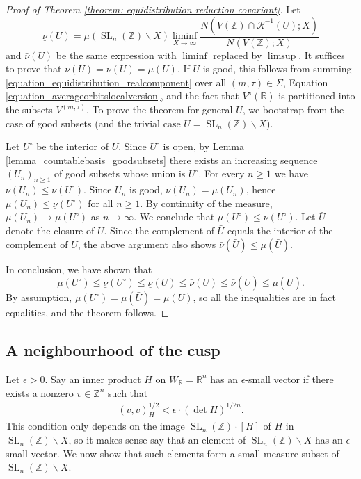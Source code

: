 \documentclass{article} %
\numberwithin{equation}{section}
\DeclareMathOperator{\SL}{SL}
\newcommand{\R}{\mathbb{R}}
\newcommand{\Z}{\mathbb{Z}}
\begin{document}
\begin{proof}[Proof of Theorem \ref{theorem: equidistribution reduction covariant}]
    Let 
    \[
    \underline{\nu}(U) = \mu(\SL_n(\Z)\backslash X) \liminf_{X\rightarrow \infty} \frac{N(V(\Z) \cap \mathcal{R}^{-1}(U);X)}{N(V(\Z);X)}
    \]
    and $\bar{\nu}(U)$ be the same expression with $\liminf$ replaced by $\limsup$.
    It suffices to prove that $\underline{\nu}(U) = \bar{\nu}(U) = \mu(U)$.
    If $U$ is good, this follows from summing \eqref{equation_equidistribution_realcomponent} over all $(m,\tau)\in \Sigma$, Equation \eqref{equation_averageorbitslocalversion}, and the fact that $V^s(\R)$ is partitioned into the subsets $V^{(m,\tau)}$.
    To prove the theorem for general $U$, we bootstrap from the case of good subsets (and the trivial case $U = \SL_n(\Z) \backslash X$).

    
    Let $U^{\circ}$ be the interior of $U$.
    Since $U^{\circ}$ is open, by Lemma \ref{lemma_countablebasis_goodsubsets} there exists an increasing sequence $(U_n)_{n\geq 1}$ of good subsets whose union is $U^{\circ}$.
    For every $n\geq 1$ we have $\underline{\nu}(U_n) \leq \underline{\nu}(U^{\circ})$.
    Since $U_n$ is good, $\underline{\nu}(U_n) = \mu(U_n)$, hence $\mu(U_n) \leq \underline{\nu}(U^{\circ})$ for all $n\geq 1$.
    By continuity of the measure, $\mu(U_n) \rightarrow \mu(U^{\circ})$ as $n\rightarrow \infty$.
    We conclude that $\mu(U^{\circ})\leq \underline{\nu}(U^{\circ})$.
    Let $\bar{U}$ denote the closure of $U$.
    Since the complement of $\bar{U}$ equals the interior of the complement of $U$, the above argument also shows $\bar{\nu}(\bar{U}) \leq \mu(\bar{U})$.

    In conclusion, we have shown that 
    \[
    \mu(U^{\circ}) \leq \underline{\nu}(U^{\circ})\leq \underline{\nu}(U) \leq \bar{\nu}(U) \leq \bar{\nu}(\bar{U}) \leq \mu(\bar{U}).
    \]
    By assumption, $\mu(U^{\circ}) = \mu(\bar{U}) = \mu(U)$, so all the inequalities are in fact equalities, and the theorem follows.
\end{proof}




\subsection{A neighbourhood of the cusp}




Let $\epsilon >0$.
Say an inner product $H$ on $W_{\R} =\R^n$ has an $\epsilon$-small vector if there exists a nonzero $v\in \Z^n$ such that 
\begin{align*}
    (v,v)^{1/2}_H< \epsilon \cdot (\det H)^{1/2n} . 
\end{align*}
This condition only depends on the image $\SL_n(\Z) \cdot [H]$ of $H$ in $\SL_n(\Z) \backslash X$, so it makes sense say that an element of $\SL_n(\Z)\backslash X$ has an $\epsilon$-small vector.
We now show that such elements form a small measure subset of $\SL_n(\Z)\backslash X$. 
\end{document}
